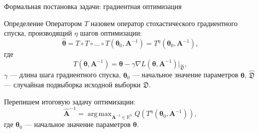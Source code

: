 \documentclass[10pt,pdf,utf8,russian,aspectratio=169]{beamer}
\DeclareMathOperator*{\argmax}{arg\,max}
\begin{document}
\begin{frame}{Формальная постановка задачи: градиентная оптимизация}
\begin{block}{Определение}
Оператором $T$ назовем оператор стохастического градиентного спуска, производящий $\eta$ шагов оптимизации:
\begin{equation}
\label{eq:gd}
	 \hat{\boldsymbol{\theta}} = T \circ T \circ \dots \circ T(\boldsymbol{\theta}_0, \mathbf{A}^{-1}) = T^\eta(\boldsymbol{\theta}_0, \mathbf{A}^{-1}),
\end{equation}
где 
$$
	T(\boldsymbol{\theta}, \mathbf{A}^{-1}) =\boldsymbol{\theta} - \gamma \nabla L(\boldsymbol{\theta}, \mathbf{A}^{-1})|_{\hat{\mathfrak{D}}}, 
$$
$\gamma$ --- длина шага градиентного спуска, $\boldsymbol{\theta}_0$ --- начальное значение параметров $\boldsymbol{\theta}$, $\hat{\mathfrak{D}}$ --- случайная подвыборка исходной выборки $\mathfrak{D}$.
\end{block}


Перепишем итоговую задачу оптимизации:
\[
	\hat{\mathbf{A}}^{-1} = \argmax_{\mathbf{A}^{-1} \in \mathbb{R}^h} Q( T^\eta(\boldsymbol{\theta}_0, \mathbf{A}^{-1})),
\]
где $\boldsymbol{\theta}_0$ --- начальное значение параметров $\boldsymbol{\theta}$.


\end{frame}
\end{document}

